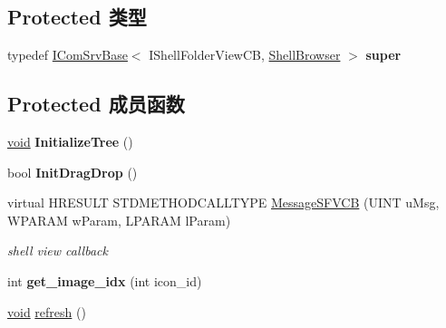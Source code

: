 \subsection*{Protected 类型}
\begin{DoxyCompactItemize}
\item 
\mbox{\label{struct_shell_browser_a1bf51d8a9726fd9a26164cb46352756a}} 
typedef \hyperlink{class_i_com_srv_base}{I\+Com\+Srv\+Base}$<$ I\+Shell\+Folder\+View\+CB, \hyperlink{struct_shell_browser}{Shell\+Browser} $>$ {\bfseries super}
\end{DoxyCompactItemize}
\subsection*{Protected 成员函数}
\begin{DoxyCompactItemize}
\item 
\mbox{\label{struct_shell_browser_a554e0fd943b73d136cd1a59d797d76da}} 
\hyperlink{interfacevoid}{void} {\bfseries Initialize\+Tree} ()
\item 
\mbox{\label{struct_shell_browser_abecd0ffb451385729555aa5ff972b958}} 
bool {\bfseries Init\+Drag\+Drop} ()
\item 
virtual H\+R\+E\+S\+U\+LT S\+T\+D\+M\+E\+T\+H\+O\+D\+C\+A\+L\+L\+T\+Y\+PE \hyperlink{struct_shell_browser_a575ee8758d47796428a80c8ac2a66c49}{Message\+S\+F\+V\+CB} (U\+I\+NT u\+Msg, W\+P\+A\+R\+AM w\+Param, L\+P\+A\+R\+AM l\+Param)
\begin{DoxyCompactList}\small\item\em shell view callback \end{DoxyCompactList}\item 
\mbox{\label{struct_shell_browser_afe5ca6981c4f92c5d02b2befba567686}} 
int {\bfseries get\+\_\+image\+\_\+idx} (int icon\+\_\+id)
\item 
\hyperlink{interfacevoid}{void} \hyperlink{struct_shell_browser_ab8cc56ea36be84287a8e7d7d1ee0f7d5}{refresh} ()
\end{DoxyCompactItemize}

